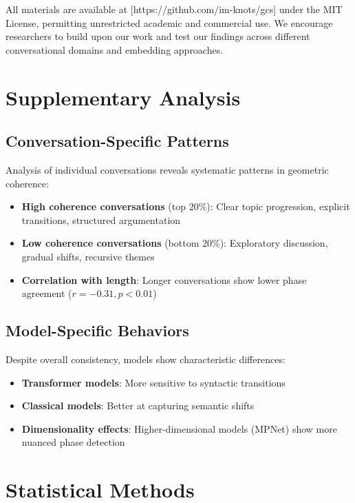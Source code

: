 \documentclass[11pt,letterpaper]{article}
\begin{document}
All materials are available at [https://github.com/im-knots/gcs] under the MIT License, permitting unrestricted academic and commercial use. We encourage researchers to build upon our work and test our findings across different conversational domains and embedding approaches.




\appendix

\section{Supplementary Analysis}

\subsection{Conversation-Specific Patterns}

Analysis of individual conversations reveals systematic patterns in geometric coherence:

\begin{itemize}
\item \textbf{High coherence conversations} (top 20\%): Clear topic progression, explicit transitions, structured argumentation
\item \textbf{Low coherence conversations} (bottom 20\%): Exploratory discussion, gradual shifts, recursive themes
\item \textbf{Correlation with length}: Longer conversations show lower phase agreement ($r = -0.31, p < 0.01$)
\end{itemize}

\subsection{Model-Specific Behaviors}

Despite overall consistency, models show characteristic differences:

\begin{itemize}
\item \textbf{Transformer models}: More sensitive to syntactic transitions
\item \textbf{Classical models}: Better at capturing semantic shifts
\item \textbf{Dimensionality effects}: Higher-dimensional models (MPNet) show more nuanced phase detection
\end{itemize}

\section{Statistical Methods}
\end{document}
